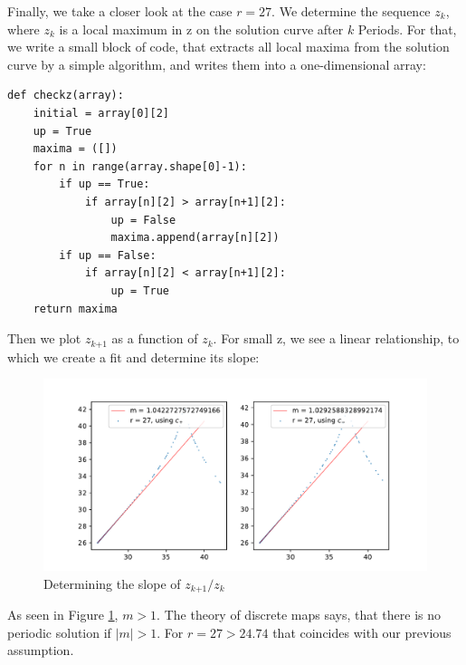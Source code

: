 \documentclass{article}
\begin{document}
Finally, we take a closer look at the case \( r = 27 \). We determine the
sequence \( z_k \), where \( z_k \) is a local maximum in z on the solution
curve after \( k \) Periods. For that, we write a small block of code, that
extracts all local maxima from the solution curve by a simple algorithm, and
writes them into a one-dimensional array:
\begin{lstlisting}
def checkz(array):
    initial = array[0][2]
    up = True
    maxima = ([])
    for n in range(array.shape[0]-1):
        if up == True:
            if array[n][2] > array[n+1][2]:
                up = False
                maxima.append(array[n][2])
        if up == False:
            if array[n][2] < array[n+1][2]:
                up = True
    return maxima
\end{lstlisting}
Then we plot \( z_{k \text{+1}} \) as a function of \( z_k \).
For small z, we see a linear relationship, to which we create a fit and determine
its slope:
\begin{figure}[ht]
    \centering
    \includegraphics[width=\textwidth]{Figure2-2.pdf} 
    \caption{Determining the slope of $z_{k\text{+1}}/z_k$}
    \label{2-2}
\end{figure}
As seen in Figure \ref{2-2}, \( m > 1 \). The theory of discrete maps says,
that there is no periodic solution if \( |m| > 1 \). For \( r = 27 > 24.74 \)
that coincides with our previous assumption.
\end{document}
